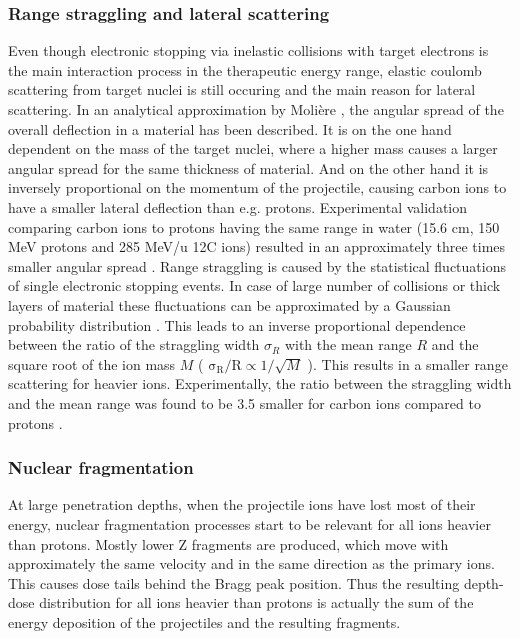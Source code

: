 \documentclass[type=dr, dr=rernat, accentcolor=tud7b,colorbacktitle, bigchapter, openright, twoside, 12pt ]{tudthesis}
\begin{document}
\subsubsection{Range straggling and lateral scattering}
\label{scat}
Even though electronic stopping via inelastic collisions with target electrons is the main interaction process in the therapeutic energy 
range, elastic coulomb scattering from target nuclei is still occuring and the main reason for lateral scattering. In an analytical 
approximation by Molière \cite{Mol48}, the angular spread of the overall deflection in a material has been described. It is 
on the one hand dependent on the mass of the target nuclei, where a higher mass causes a larger angular spread for the same thickness 
of material. And on the other hand it is inversely proportional on the momentum of the projectile, causing carbon ions to have a smaller 
lateral deflection than e.g. protons. Experimental validation comparing carbon ions to protons having the same range in water 
(15.6 cm, 150 MeV protons and 285 MeV/u 12C ions) resulted in an approximately three times smaller angular spread \cite{Sch10}.\newline
\newline
Range straggling is caused by the statistical fluctuations of single electronic stopping events. In case of large number of collisions or 
thick layers of material these fluctuations can be approximated by a Gaussian probability distribution \cite{Bor40} 
\cite{Ahl80} \cite{Ric12}. This leads to an inverse proportional dependence between the ratio of the straggling width $\sigma_{R}$ with 
the mean range $R$ and the square root of the ion mass $M$ ( $\mathrm{\sigma_{R}}/\mathrm{R} \propto \mathrm{1}/{\sqrt{M}}$ ). This results 
in a smaller range scattering for heavier ions. Experimentally, the ratio between the straggling width and the mean range was found to be 
3.5 smaller for carbon ions compared to protons \cite{Sch10}.


\subsubsection{Nuclear fragmentation}

At large penetration depths, when the projectile ions have lost most of their energy, nuclear fragmentation processes start to be 
relevant for all ions heavier than protons. Mostly lower Z fragments are produced, which move with approximately the same velocity 
and in the same direction as the primary ions. This causes dose tails behind the Bragg peak position. Thus the resulting depth-dose 
distribution for all ions heavier than protons is actually the sum of the energy deposition of the projectiles and the resulting 
fragments. 
\end{document}
